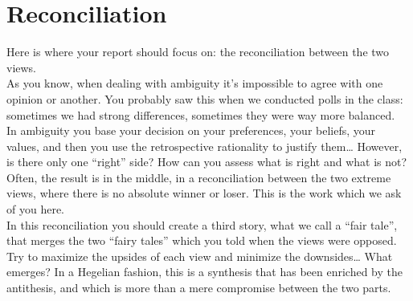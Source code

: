 \section{Reconciliation}
Here is where your report should focus on: the reconciliation between the two views. \\
As you know, when dealing with ambiguity it’s impossible to agree with one opinion or another. You probably saw this when we conducted polls in the class: sometimes we had strong differences, sometimes they were way more balanced. \\
In ambiguity you base your decision on your preferences, your beliefs, your values, and then you use the retrospective rationality to justify them… However, is there only one “right” side? How can you assess what is right and what is not? Often, the result is in the middle, in a reconciliation between the two extreme views, where there is no absolute winner or loser. This is the work which we ask of you here.\\
In this reconciliation you should create a third story, what we call a “fair tale”, that merges the two “fairy tales” which you told when the views were opposed. Try to maximize the upsides of each view and minimize the downsides… What emerges? In a Hegelian fashion, this is a synthesis that has been enriched by the antithesis, and which is more than a mere compromise between the two parts.